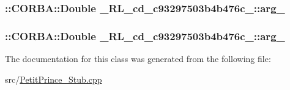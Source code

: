 \subsubsection[{\texorpdfstring{arg\+\_\+1}{arg_1}}]{\setlength{\rightskip}{0pt plus 5cm}\+::C\+O\+R\+B\+A\+::\+Double \+\_\+R\+L\+\_\+cd\+\_\+c93297503b4b476c\+\_\+::arg\+\_}\hypertarget{class__0_r_l__cd__c93297503b4b476c__50000000_a47d6cd5ebcdbf217e29a25baba671df8}{}\label{class__0_r_l__cd__c93297503b4b476c__50000000_a47d6cd5ebcdbf217e29a25baba671df8}
\subsubsection[{\texorpdfstring{arg\+\_\+2}{arg_2}}]{\setlength{\rightskip}{0pt plus 5cm}\+::C\+O\+R\+B\+A\+::\+Double \+\_\+R\+L\+\_\+cd\+\_\+c93297503b4b476c\+\_\+::arg\+\_}\hypertarget{class__0_r_l__cd__c93297503b4b476c__50000000_a6db84fccb3f773ae9dcf309b0b7e3682}{}\label{class__0_r_l__cd__c93297503b4b476c__50000000_a6db84fccb3f773ae9dcf309b0b7e3682}


The documentation for this class was generated from the following file\+:\begin{DoxyCompactItemize}
\item 
src/\hyperlink{_petit_prince___stub_8cpp}{Petit\+Prince\+\_\+\+Stub.\+cpp}\end{DoxyCompactItemize}
